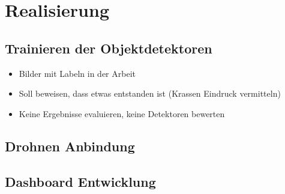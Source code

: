 \chapter{Realisierung}

\section{Trainieren der Objektdetektoren}

\begin{itemize}
	\item Bilder mit Labeln in der Arbeit
	\item Soll beweisen, dass etwas entstanden ist (Krassen Eindruck vermitteln)
	\item Keine Ergebnisse evaluieren, keine Detektoren bewerten
\end{itemize}

\section{Drohnen Anbindung}

\section{Dashboard Entwicklung}
